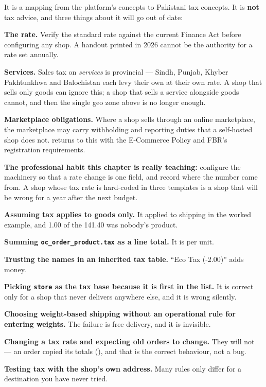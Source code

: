 \begin{alertbox}
It is a mapping from the platform's concepts to Pakistani tax concepts. It is
\textbf{not} tax advice, and three things about it will go out of date:

\begin{tight}
  \item \textbf{The rate.} Verify the standard rate against the current Finance
        Act before configuring any shop. A handout printed in 2026 cannot be
        the authority for a rate set annually.
  \item \textbf{Services.} Sales tax on \emph{services} is provincial --- Sindh,
        Punjab, Khyber Pakhtunkhwa and Balochistan each levy their own at
        their own rate. A shop that sells only goods can ignore this; a shop
        that sells a service alongside goods cannot, and then the single geo
        zone above is no longer enough.
  \item \textbf{Marketplace obligations.} Where a shop sells through an online
        marketplace, the marketplace may carry withholding and reporting duties
        that a self-hosted shop does not.  returns to this with
        the E-Commerce Policy and FBR's registration requirements.
\end{tight}

\textbf{The professional habit this chapter is really teaching:} configure the
machinery so that a rate change is one field, and record where the number came
from. A shop whose tax rate is hard-coded in three templates is a shop that
will be wrong for a year after the next budget.
\end{alertbox}

\begin{pitfall}
\begin{tight}
  \item \textbf{Assuming tax applies to goods only.} It applied to shipping in
        the worked example, and 1.00 of the 141.40 was nobody's product.
  \item \textbf{Summing \texttt{oc\_order\_product.tax} as a line total.} It is
        per unit.
  \item \textbf{Trusting the names in an inherited tax table.} ``Eco Tax
        (-2.00)'' adds money.
  \item \textbf{Picking \texttt{store} as the tax base because it is first in
        the list.} It is correct only for a shop that never delivers anywhere
        else, and it is wrong silently.
  \item \textbf{Choosing weight-based shipping without an operational rule for
        entering weights.} The failure is free delivery, and it is invisible.
  \item \textbf{Changing a tax rate and expecting old orders to change.} They
        will not --- an order copied its totals (), and that is
        the correct behaviour, not a bug.
  \item \textbf{Testing tax with the shop's own address.} Many rules only
        differ for a destination you have never tried.
\end{tight}
\end{pitfall}

